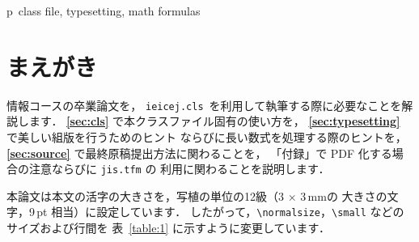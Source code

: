 \documentclass[paper]{ieicej}%
\def\ANCTJcls{\texttt{ieicej.cls}}
\def\ANCTJver{1.0}
\begin{document}
\makeatletter
\if@letter
  \makeatother
  \maketitle
\fi
\begin{abstract}
  Course of Information Engineering
  provides a p\LaTeXe\ class file, named \ANCTJcls\ (ver.\,\ANCTJver),
  for the Graduation Thesis. This document describes how to use
  the class file, and also makes some remarks about typesetting
  a manuscript by using the p\LaTeXe.
  The design is based on ASCII Japanese p\LaTeXe.
\end{abstract}
\begin{keyword}
  p\LaTeXe\ class file, typesetting, math formulas
\end{keyword}
\makeatletter
\if@letter
  \makeatother
\else
  \maketitle
\fi

\section{まえがき}

 情報コースの卒業論文を，
 \ANCTJcls\ を利用して執筆する際に必要なことを解説します．
 {\bfseries \ref{sec:cls}} で本クラスファイル固有の使い方を，
 {\bfseries \ref{sec:typesetting}} で美しい組版を行うためのヒント
 ならびに長い数式を処理する際のヒントを，
 {\bfseries \ref{sec:source}} で最終原稿提出方法に関わることを，
 「付録」で PDF 化する場合の注意ならびに \texttt{jis.tfm} の
 利用に関わることを説明します．

 本論文は本文の活字の大きさを，写植の単位の12級（3 $\times$ 3\,mmの
 大きさの文字，9\,pt 相当）に設定しています．
 したがって，\verb/\normalsize/，\verb/\small/ などのサイズおよび行間を
 表~\ref{table:1} に示すように変更しています．
\end{document}
